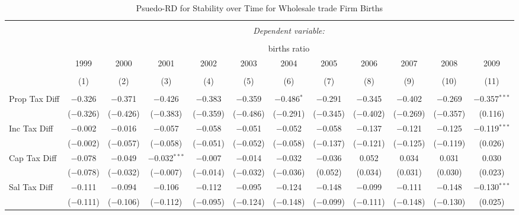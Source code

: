 
\begin{table}[!htbp] \centering 
  \caption{Psuedo-RD for Stability over Time for  Wholesale trade Firm Births} 
  \label{42year} 
\small 
\begin{tabular}{@{\extracolsep{5pt}}lccccccccccc} 
\\[-1.8ex]\hline 
\hline \\[-1.8ex] 
 & \multicolumn{11}{c}{\textit{Dependent variable:}} \\ 
\cline{2-12} 
\\[-1.8ex] & \multicolumn{11}{c}{births ratio} \\ 
 & 1999 & 2000 & 2001 & 2002 & 2003 & 2004 & 2005 & 2006 & 2007 & 2008 & 2009 \\ 
\\[-1.8ex] & (1) & (2) & (3) & (4) & (5) & (6) & (7) & (8) & (9) & (10) & (11)\\ 
\hline \\[-1.8ex] 
 Prop Tax Diff & $-$0.326 & $-$0.371 & $-$0.426 & $-$0.383 & $-$0.359 & $-$0.486$^{*}$ & $-$0.291 & $-$0.345 & $-$0.402 & $-$0.269 & $-$0.357$^{***}$ \\ 
  & ($-$0.326) & ($-$0.426) & ($-$0.383) & ($-$0.359) & ($-$0.486) & ($-$0.291) & ($-$0.345) & ($-$0.402) & ($-$0.269) & ($-$0.357) & (0.116) \\ 
  Inc Tax Diff & $-$0.002 & $-$0.016 & $-$0.057 & $-$0.058 & $-$0.051 & $-$0.052 & $-$0.058 & $-$0.137 & $-$0.121 & $-$0.125 & $-$0.119$^{***}$ \\ 
  & ($-$0.002) & ($-$0.057) & ($-$0.058) & ($-$0.051) & ($-$0.052) & ($-$0.058) & ($-$0.137) & ($-$0.121) & ($-$0.125) & ($-$0.119) & (0.026) \\ 
  Cap Tax Diff & $-$0.078 & $-$0.049 & $-$0.032$^{***}$ & $-$0.007 & $-$0.014 & $-$0.032 & $-$0.036 & 0.052 & 0.034 & 0.031 & 0.030 \\ 
  & ($-$0.078) & ($-$0.032) & ($-$0.007) & ($-$0.014) & ($-$0.032) & ($-$0.036) & (0.052) & (0.034) & (0.031) & (0.030) & (0.023) \\ 
  Sal Tax Diff & $-$0.111 & $-$0.094 & $-$0.106 & $-$0.112 & $-$0.095 & $-$0.124 & $-$0.148 & $-$0.099 & $-$0.111 & $-$0.148 & $-$0.130$^{***}$ \\ 
  & ($-$0.111) & ($-$0.106) & ($-$0.112) & ($-$0.095) & ($-$0.124) & ($-$0.148) & ($-$0.099) & ($-$0.111) & ($-$0.148) & ($-$0.130) & (0.025) \\ 

\end{tabular}
\end{table}
